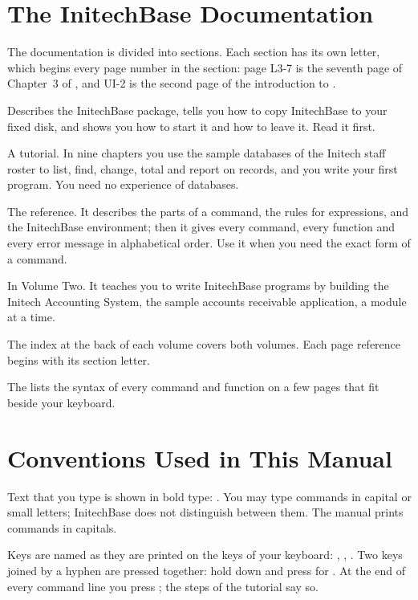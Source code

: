 \section{The InitechBase Documentation}
The documentation is divided into sections.  Each section has its own
letter, which begins every page number in the section: page L3-7 is the
seventh page of Chapter~3 of , and UI-2 is the
second page of the introduction to .

Describes the InitechBase package, tells you
how to copy InitechBase to your fixed disk, and shows you how to start it and
how to leave it.  Read it first.

A tutorial.  In nine chapters you use the
sample databases of the Initech staff roster to list, find, change, total and
report on records, and you write your first program.  You need no experience
of databases.

The reference.  It describes the parts of a
command, the rules for expressions, and the InitechBase environment; then it
gives every command, every function and every error message in alphabetical
order.  Use it when you need the exact form of a command.

In Volume Two.  It teaches you to
write InitechBase programs by building the Initech Accounting System, the
sample accounts receivable application, a module at a time.

The index at the back of each volume covers both
volumes.  Each page reference begins with its section letter.

The 
lists the syntax of every command and function on a few pages that fit beside
your keyboard.

\section{Conventions Used in This Manual}
Text that you type is shown in bold type:
.  You may type commands in capital or small letters;
InitechBase does not distinguish between them.  The manual prints commands in
capitals.

Keys are named as they are printed on the keys of your
keyboard: , , .  Two keys joined by a
hyphen are pressed together: hold down  and press  for
.  At the end of every command line you press ; the
steps of the tutorial say so.

